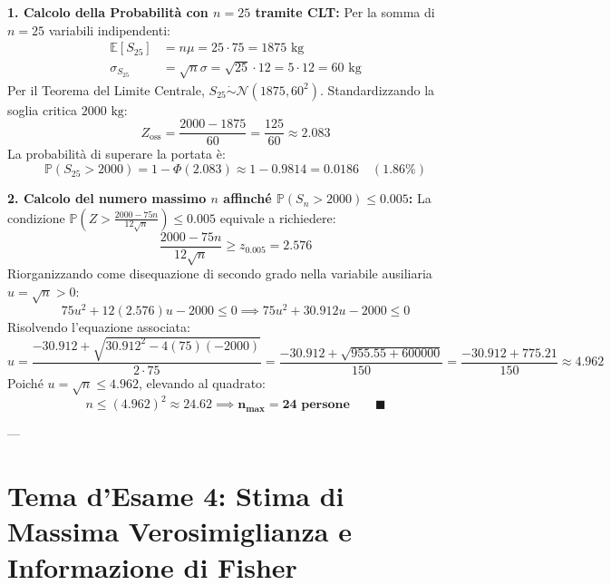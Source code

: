 \begin{dimostrazione}
\textbf{1. Calcolo della Probabilità con $n = 25$ tramite CLT:}
Per la somma di $n=25$ variabili indipendenti:
\begin{align*}
    \mathbb{E}[S_{25}] &= n \mu = 25 \cdot 75 = 1875\text{ kg} \\
    \sigma_{S_{25}} &= \sqrt{n} \sigma = \sqrt{25} \cdot 12 = 5 \cdot 12 = 60\text{ kg}
\end{align*}
Per il Teorema del Limite Centrale, $S_{25} \mathrel{\dot{\sim}} \mathcal{N}(1875, 60^2)$.
Standardizzando la soglia critica $2000\text{ kg}$:
\begin{equation*}
    Z_{\text{oss}} = \frac{2000 - 1875}{60} = \frac{125}{60} \approx 2.083
\end{equation*}
La probabilità di superare la portata è:
\begin{equation*}
    \mathbb{P}(S_{25} > 2000) = 1 - \Phi(2.083) \approx 1 - 0.9814 = \bm{0.0186} \quad (\bm{1.86\%})
\end{equation*}

\textbf{2. Calcolo del numero massimo $n$ affinché $\mathbb{P}(S_n > 2000) \le 0.005$:}
La condizione $\mathbb{P}\left(Z > \frac{2000 - 75n}{12\sqrt{n}}\right) \le 0.005$ equivale a richiedere:
\begin{equation*}
    \frac{2000 - 75n}{12\sqrt{n}} \ge z_{0.005} = 2.576
\end{equation*}
Riorganizzando come disequazione di secondo grado nella variabile ausiliaria $u = \sqrt{n} > 0$:
\begin{equation*}
    75 u^2 + 12(2.576) u - 2000 \le 0 \implies 75 u^2 + 30.912 u - 2000 \le 0
\end{equation*}
Risolvendo l'equazione associata:
\begin{equation*}
    u = \frac{-30.912 + \sqrt{30.912^2 - 4(75)(-2000)}}{2 \cdot 75} = \frac{-30.912 + \sqrt{955.55 + 600000}}{150} = \frac{-30.912 + 775.21}{150} \approx 4.962
\end{equation*}
Poiché $u = \sqrt{n} \le 4.962$, elevando al quadrato:
\begin{equation*}
    n \le (4.962)^2 \approx 24.62 \implies \bm{n_{\max} = 24 \text{ persone}} \qquad \blacksquare
\end{equation*}
\end{dimostrazione}

---

\section{Tema d'Esame 4: Stima di Massima Verosimiglianza e Informazione di Fisher}

